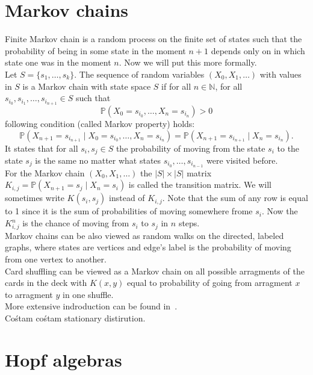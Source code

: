 \documentclass[a4paper]{article}
\begin{document}
\section{Markov chains}
Finite Markov chain is a random process on the finite set of states such that
the probability of being in some state in the moment $n+1$ depends only on in which state one was
in the moment $n$. Now we will put this more formally.\\
Let $S = \{s_1, \dots, s_k\}$. The sequence of random variables $(X_0, X_1, \dots)$ with values in $S$
is a Markov chain with state space $S$ if for all $n \in \mathbb{N}$,
for all $s_{i_0}, s_{i_1}, \dots, s_{i_{n+1}} \in S$ such that
\begin{equation*}
\mathbb{P}(X_0 = s_{i_0}, \dots, X_n = s_{i_n}) > 0
\end{equation*}
following condition (called Markov property) holds:
\begin{equation}
\mathbb{P}(X_{n+1} = s_{i_{n+1}} \mid X_0 = s_{i_0}, \dots, X_n = s_{i_n}) =
\mathbb{P}(X_{n+1} = s_{i_{n+1}} \mid X_n = s_{i_n}).
\end{equation}
It states that for all $s_i, s_j \in S$ the probability of moving from the state
$s_i$ to the state $s_j$ is the same no matter what states $s_{i_0}, \dots, s_{i_{n-1}}$
were visited before. \\
For the Markov chain $(X_0, X_1, \dots)$ the $|S| \times |S|$ matrix
$K_{i,j} = \mathbb{P}(X_{n+1} = s_j \mid X_n = s_i)$ is called the transition matrix. We will sometimes
write $K(s_i, s_j)$ instead of $K_{i,j}$. Note that the sum of
any row is equal to 1 since it is the sum of probabilities of moving somewhere frome $s_i$.
Now the $K^n_{i,j}$ is the chance of moving from $s_i$ to $s_j$ in $n$ steps. \\
Markov chains can be also viewed as random walks on the directed, labeled graphs, where states are vertices
and edge's label is the probability of moving from one vertex to another. \\
Card shuffling can be viewed as a Markov chain on all possible arragments of the cards
in the deck with $K(x,y)$ equal to probability of going from arragment $x$ to arragment $y$ in one shuffle. \\
More extensive indroduction can be found in~\cite{LePeWi}. \\
Cośtam cośtam stationary distirution. \\

\section{Hopf algebras}
%
\end{document}
